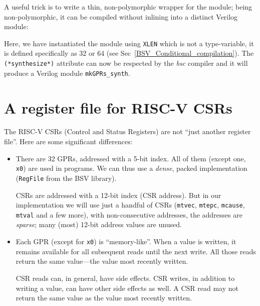 A useful trick is to write a thin, non-polymorphic wrapper for the
module; being non-polymorphic, it can be compiled without inlining
into a distinct Verilog module:



Here, we have instantiated the module using \verb|XLEN| which is not a
type-variable, it is defined specifically as 32 or 64 (see
Sec~\ref{BSV_Conditional_compilation}).  The \verb|(*synthesize*)|
attribute can now be respected by the \emph{bsc} compiler and it will
produce a Verilog module \verb|mkGPRs_synth|.


\section{A register file for RISC-V CSRs}

\label{Sec_RISCV_CSRs}

The RISC-V CSRs (Control and Status Registers) are not ``just another
register file''.  Here are some significant differences:

\begin{itemize}

 \item There are 32 GPRs, addressed with a 5-bit index.  All of them
       (except one, \verb|x0|) are used in programs.  We can thus use
       a \emph{dense}, packed implementation (\verb|RegFile| from the
       BSV library).

       CSRs are addressed with a 12-bit index (CSR address).  But in
       our implementation we will use just a handful of CSRs
       (\verb|mtvec|, \verb|mtepc|, \verb|mcause|, \verb|mtval| and a
       few more), with non-consecutive addresses, {\ie} the addresses
       are \emph{sparse}; many (most) 12-bit address values are
       unused.

 \item Each GPR (except for \verb|x0|) is ``memory-like''.  When a
       value is written, it remains available for all subsequent reads
       until the next write.  All those reads return the same
       value---the value most recently written.

       CSR reads can, in general, have side effects.  CSR writes, in
       addition to writing a value, can have other side effects as
       well.  A CSR read may not return the same value as the value
       most recently written.

\end{itemize}

